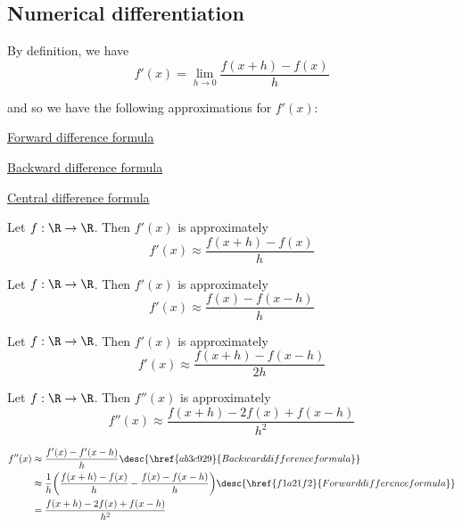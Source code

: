 \subsection{Numerical differentiation}\label{f694b5d}

\label{edddb46}

By definition, we have
$$
  f'(x)=\lim_{h\to0}\frac{f(x+h)-f(x)}h
$$

and so we have the following approximations for $f'(x)$:
\begin{enumerata}
  \item \href{f1a21f2}{Forward difference formula}
  \item \href{ab3c929}{Backward difference formula}
  \item \href{e9d076b}{Central difference formula}
\end{enumerata}

\label{f1a21f2}

Let $f:\R\to\R$. Then $f'(x)$ is approximately
$$
  f'(x)\approx\frac{f(x+h)-f(x)}{h}
$$

\label{ab3c929}

Let $f:\R\to\R$. Then $f'(x)$ is approximately
$$
  f'(x)\approx\frac{f(x)-f(x-h)}{h}
$$

\label{e9d076b}

Let $f:\R\to\R$. Then $f'(x)$ is approximately
$$
  f'(x)\approx\frac{f(x+h)-f(x-h)}{2h}
$$

\label{d8ed9d2}

Let $f:\R\to\R$. Then $f''(x)$ is approximately
$$
  f''(x)\approx\frac{f(x+h)-2f(x)+f(x-h)}{h^2}
$$

\begin{derive}
  \begin{align*}
    f''(x) &\approx\frac{f'(x)-f'(x-h)}{h}\desc{\href{ab3c929}{Backward difference formula}}                                         \\
           &\approx\frac1h\biggl(\frac{f(x+h)-f(x)}{h}-\frac{f(x)-f(x-h)}{h}\biggr)\desc{\href{f1a21f2}{Forward difference formula}} \\
           &=\frac{f(x+h)-2f(x)+f(x-h)}{h^2}
  \end{align*}
\end{derive}
